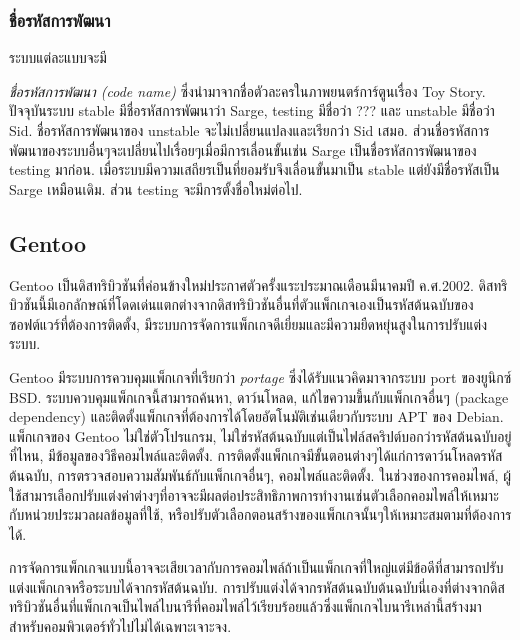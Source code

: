 \begin{thwbr}
{\subsubsection{ชื่อรหัสการพัฒนา}
ระบบแต่ละแบบจะมี{\emph{ชื่อรหัสการพัฒนา (code name)} ซึ่งนำมาจากชื่อตัวละครในภาพยนตร์การ์ตูนเรื่อง Toy Story. ปัจจุบันระบบ stable มีชื่อรหัสการพัฒนาว่า Sarge, testing มีชื่อว่า ???  และ unstable มีชื่อว่า Sid. ชื่อรหัสการพัฒนาของ unstable จะไม่เปลี่ยนแปลงและเรียกว่า Sid เสมอ. ส่วนชื่อรหัสการพัฒนาของระบบอื่นๆจะเปลี่ยนไปเรื่อยๆเมื่อมีการเลื่อนขั้นเช่น Sarge เป็นชื่อรหัสการพัฒนาของ testing มาก่อน. เมื่อระบบมีความเสถียรเป็นที่ยอมรับจึงเลื่อนขั้นมาเป็น stable แต่ยังมีชื่อรหัสเป็น Sarge เหมือนเดิม. ส่วน testing จะมีการตั้งชื่อใหม่ต่อไป.


\subsection{{\latintext Gentoo}}%

Gentoo เป็นดิสทริบิวชันที่ค่อนข้างใหม่ประกาศตัวครั้งแระประมาณเดือนมีนาคมปี ค.ศ.2002. ดิสทริบิวชันนี้มีเอกลักษณ์ที่โดดเด่นแตกต่างจากดิสทริบิวชันอื่นที่ตัวแพ็กเกจเองเป็นรหัสต้นฉบับของซอฟต์แวร์ที่ต้องการติดตั้ง, มีระบบการจัดการแพ็กเกจดีเยี่ยมและมีความยืดหยุ่นสูงในการปรับแต่งระบบ. 

Gentoo มีระบบการควบคุมแพ็กเกจที่เรียกว่า \emph{portage} ซึ่งได้รับแนวคิดมาจากระบบ port ของยูนิกซ์ BSD. ระบบควบคุมแพ็กเกจนี้สามารถค้นหา, ดาว์นโหลด, แก้ไขความขึ้นกับแพ็กเกจอื่นๆ (package dependency) และติดตั้งแพ็กเกจที่ต้องการได้โดยอัตโนมัติเช่นเดียวกับระบบ APT ของ Debian. แพ็กเกจของ Gentoo ไม่ใช่ตัวโปรแกรม, ไม่ใช่รหัสต้นฉบับแต่เป็นไฟล์สคริปต์บอกว่ารหัสต้นฉบับอยู่ที่ไหน, มีข้อมูลของวิธีคอมไพล์และติดตั้ง. การติดตั้งแพ็กเกจมีขั้นตอนต่างๆได้แก่การดาว์นโหลดรหัสต้นฉบับ, การตรวจสอบความสัมพันธ์กับแพ็กเกจอื่นๆ, คอมไพล์และติดตั้ง. ในช่วงของการคอมไพล์, ผู้ใช้สามารเลือกปรับแต่งค่าต่างๆที่อาจจะมีผลต่อประสิทธิภาพการทำงานเช่นตัวเลือกคอมไพล์ให้เหมาะกับหน่วยประมวลผลข้อมูลที่ใช้, หรือปรับตัวเลือกตอนสร้างของแพ็กเกจนั้นๆให้เหมาะสมตามที่ต้องการได้. 

การจัดการแพ็กเกจแบบนี้อาจจะเสียเวลากับการคอมไพล์ถ้าเป็นแพ็กเกจที่ใหญ่แต่มีข้อดีที่สามารถปรับแต่งแพ็กเกจหรือระบบได้จากรหัสต้นฉบับ. การปรับแต่งได้จากรหัสต้นฉบับต้นฉบับนี่เองที่ต่างจากดิสทริบิวชันอื่นที่แพ็กเกจเป็นไพล์ไบนารีที่คอมไพล์ไว้เรียบร้อยแล้วซึ่งแพ็กเกจไบนารีเหล่านี้สร้างมาสำหรับคอมพิวเตอร์ทั่วไปไม่ได้เฉพาะเจาะจง. 

}}
\end{thwbr}
